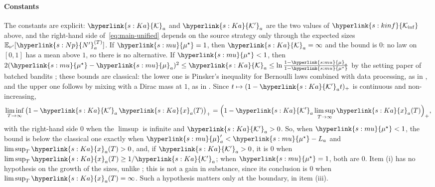 \documentclass[11pt]{article}
\newcommand{\sy}[2]{\hyperlink{#1}{#2}}
\newcommand{\E}{\mathbb{E}}
\newcommand{\Kinf}{\sy{s:kinf}{\mathcal{K}_{\inf}}}
\newcommand{\mean}{\sy{s:mu}{\mu}}
\newcommand{\ms}{\sy{s:mu}{\mu^{\star}}}
\newcommand{\Np}{\sy{s:Np}{N'}}
\newcommand{\Ka}{\sy{s:Ka}{\mathcal{K}}}
\newcommand{\Kp}{\sy{s:Ka}{\mathcal{K}'}}
\newcommand{\xr}{\sy{s:Ka}{x}}
\begin{document}
\paragraph{Constants} The constants are explicit: $\Ka_a$ and $\Kp_a$ are the two values of
$\Kinf$ above, and the right-hand side of~\eqref{eq:main-unified} depends on the source strategy
only through the expected sizes $\E_{\nu'}[\Np^{(T)}_a]$. If $\ms=1$, then $\Ka_a=\infty$ and the
bound is $0$: no law on $[0,1]$ has a mean above $1$, so there is no alternative. If
$\ms<1$, then $2(\ms-\mean_a)^2\le\Ka_a\le\ln\frac{1-\mean_a}{1-\ms}$ by
the setting paper of batched bandits \citep[Proposition~4.2]{INC-P006}; these bounds are classical:
the lower one is Pinsker's inequality for Bernoulli laws combined with data processing, as in
\citet[(7)]{GHMS22}, and the upper one follows by mixing with a Dirac mass at $1$, as in
\citet[Appendix~B.1]{GHMS22}. Since $t\mapsto(1-\Kp_at)_+$ is continuous and non-increasing,
\begin{equation*}
\liminf_{T\to\infty}\big(1-\Kp_a\,\xr_a(T)\big)_+=\Big(1-\Kp_a\limsup_{T\to\infty}\xr_a(T)\Big)_+,
\end{equation*}
with the right-hand side $0$ when the $\limsup$ is infinite and $\Kp_a>0$. So, when $\ms<1$, the
bound is below the classical one exactly when $\mean'_a<\ms-L_a$ and $\limsup_T\xr_a(T)>0$, and,
if $\Kp_a>0$, it is $0$ when $\limsup_T\xr_a(T)\ge1/\Kp_a$; when $\ms=1$, both are $0$. Item (i) has no hypothesis on the growth of the sizes, unlike
\citet[Theorem~2(i)]{PMRM26}; this is not a gain in substance, since its conclusion is $0$ when
$\limsup_T\xr_a(T)=\infty$. Such a hypothesis matters only at the boundary, in item (iii).
\end{document}
